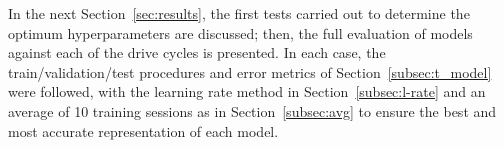 %
%
 {
    In the next Section~\ref{sec:results}, the first tests carried out to determine the optimum hyperparameters are discussed; then, the full evaluation of models against each of the drive cycles is presented.
    In each case, the train/validation/test procedures and error metrics of \mbox{Section~\ref{subsec:t_model}} were followed, with the learning rate method in Section~\ref{subsec:l-rate} and an average of 10 training sessions as in Section~\ref{subsec:avg} to ensure the best and most accurate representation of each model.
}